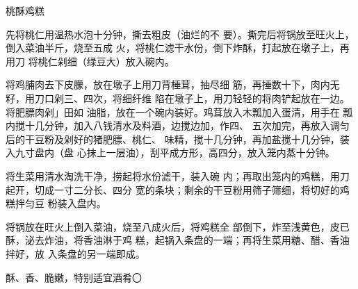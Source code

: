 \begin{recipe}{桃酥鸡糕}

\ingredients


\cooking

\step 先将桃仁用温热水泡十分钟，撕去粗皮（油烂的不 要）。撕完后将锅放至旺火上，倒入菜油半斤，烧至五成 火，将桃仁滤干水份，倒下炸酥，打起放在墩子上，再用刀 将桃仁剁细（绿豆大）放入碗内。

将鸡脯肉去下皮朦，放在墩子上用刀背棰茸，抽尽细 筋，再捶数十下，肉内无籽，用刀口剁三、四次，将细纤维 陷在墩子上，用刀轻轻的将肉铲起放在一边。将肥膘肉剁」田如 油脂，放在一个碗内装好。鸡茸放入木瓢加入蛋清，用手在 瓢内搅十几分钟，加入八钱清水及料酒，边搅边加，作四、 五次加完，再放入调匀后的干豆粉及剁好的猪肥膘、桃仁、 味精，搅十几分钟，再加盐搅十几分钟，装入九寸盘内（盘 心抹上一层油），刮平成方形，高四分，放入笼内蒸十分钟。

\step 将生菜用清水淘洗干净，捞起将水份滤干，装入碗 内；再取出笼内的鸡糕，用刀起开，切成一寸二分长、四分 宽的条块；剩余的干豆粉用筛子筛细，将切好的鸡糕拌匀豆 粉装入盘内。

将锅放在旺火上倒入菜油，烧至八成火后，将鸡糕全 部倒下，炸至浅黄色，皮已酥，泌去炸油，将香油淋于鸡 糕，起锅入条盘的一端；再将生菜用糖、醋、香油拌好，放 入条盘的另一端即成。

\notes

酥、香、脆嫩，特别适宜酒肴〇

\end{recipe}

